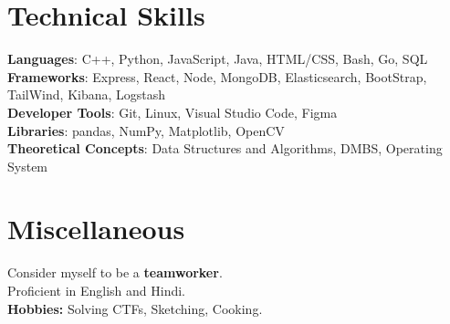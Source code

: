 \documentclass[a4paper,20pt]{article}
\begin{document}
%
\section{Technical Skills}
 \begin{itemize}[leftmargin=0.15in, label={}]
    \small{\item{
     \textbf{Languages}{: C++, Python, JavaScript, Java, HTML/CSS, Bash, Go, SQL} \\
     \textbf{Frameworks}{: Express, React, Node, MongoDB, Elasticsearch, BootStrap, TailWind, Kibana, Logstash } \\
     \textbf{Developer Tools}{: Git, Linux, Visual Studio Code, Figma} \\
     \textbf{Libraries}{: pandas, NumPy, Matplotlib, OpenCV} \\
     \textbf{Theoretical Concepts}{: Data Structures and Algorithms, DMBS, Operating System} \\
    }}
 \end{itemize}
 \vspace{-16pt}

%
\section{Miscellaneous}
 \begin{itemize}[leftmargin=0.15in, label={}]
    \small{\item{
     {Consider myself to be a \textbf{teamworker}.} \\
     {Proficient in English and Hindi.} \\
     {\textbf{Hobbies:} Solving CTFs, Sketching, Cooking.} \\
    }}
 \end{itemize}
 \vspace{-16pt}
\end{document}
